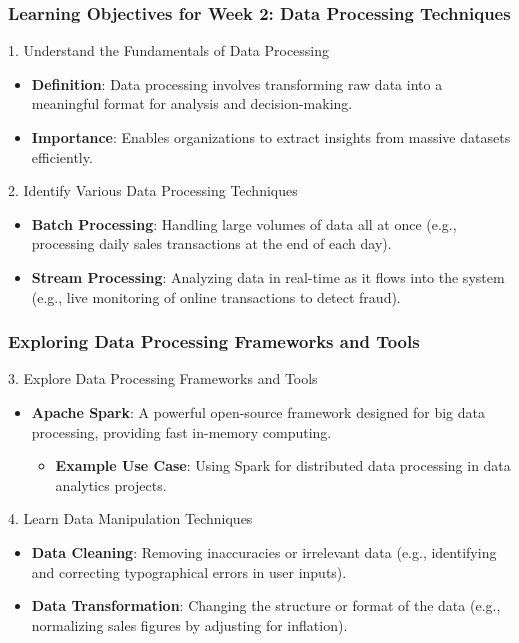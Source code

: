 \documentclass[aspectratio=169]{beamer}
\begin{document}
\begin{frame}[fragile]
    \frametitle{Learning Objectives for Week 2: Data Processing Techniques}
    \begin{block}{1. Understand the Fundamentals of Data Processing}
        \begin{itemize}
            \item \textbf{Definition}: Data processing involves transforming raw data into a meaningful format for analysis and decision-making.
            \item \textbf{Importance}: Enables organizations to extract insights from massive datasets efficiently.
        \end{itemize}
    \end{block}
    
    \begin{block}{2. Identify Various Data Processing Techniques}
        \begin{itemize}
            \item \textbf{Batch Processing}: Handling large volumes of data all at once (e.g., processing daily sales transactions at the end of each day).
            \item \textbf{Stream Processing}: Analyzing data in real-time as it flows into the system (e.g., live monitoring of online transactions to detect fraud).
        \end{itemize}
    \end{block}
\end{frame}

\begin{frame}[fragile]
    \frametitle{Exploring Data Processing Frameworks and Tools}
    \begin{block}{3. Explore Data Processing Frameworks and Tools}
        \begin{itemize}
            \item \textbf{Apache Spark}: A powerful open-source framework designed for big data processing, providing fast in-memory computing.
            \begin{itemize}
                \item \textbf{Example Use Case}: Using Spark for distributed data processing in data analytics projects.
            \end{itemize}
        \end{itemize}
    \end{block}
    
    \begin{block}{4. Learn Data Manipulation Techniques}
        \begin{itemize}
            \item \textbf{Data Cleaning}: Removing inaccuracies or irrelevant data (e.g., identifying and correcting typographical errors in user inputs).
            \item \textbf{Data Transformation}: Changing the structure or format of the data (e.g., normalizing sales figures by adjusting for inflation).
        \end{itemize}
    \end{block}
\end{frame}
\end{document}
